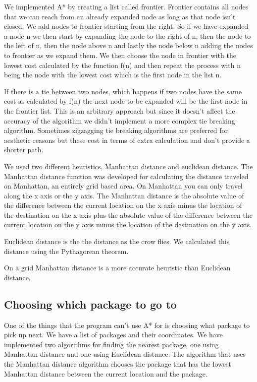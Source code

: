 \documentclass[12pt, a4paper]{article}
\begin{document}
We implemented A* by creating a list called frontier. Frontier contains all nodes that we can reach from an already expanded node as long as that node isn't closed. We add nodes to frontier starting from the right. So if we have expanded a node n we then start by expanding the node to the right of n, then the node to the left of n, then the node above n and lastly the node below n adding the nodes to frontier as we expand them. We then choose the node in frontier with the lowest cost calculated by the function f(n) and then repeat the process with n being the node with the lowest cost which is the first node in the list n.

If there is a tie between two nodes, which happens if two nodes have the same cost as calculated by f(n) the next node to be expanded will be the first node in the frontier list. This is an arbitrary approach but since it doesn't affect the accuracy of the algorithm we didn't implement a more complex tie breaking algorithm. Sometimes zigzagging tie breaking algorithms are preferred for aesthetic reasons but these cost in terms of extra calculation and don't provide a shorter path. 

We used two different heuristics, Manhattan distance and euclidean distance. The Manhattan distance function was developed for calculating the distance traveled on Manhattan, an entirely grid based area. On Manhattan you can only travel along the x axis or the y axis. The Manhattan distance is the absolute value of the difference between the current location on the x axis minus the location of the destination on the x axis plus the absolute value of the difference between the current location on the y axis minus the location of the destination on the y axis.

Euclidean distance is the the distance as the crow flies. We calculated this distance using the Pythagorean theorem. 

On a grid Manhattan distance is a more accurate heuristic than Euclidean distance. 

\subsection{Choosing which package to go to}

One of the things that the program can't use A* for is choosing what package to pick up next. We have a list of packages and their coordinates. We have implemented two algorithms for finding the nearest package, one using Manhattan distance and one using Euclidean distance. The algorithm that uses the Manhattan distance algorithm chooses the package that has the lowest Manhattan distance between the current location and the package.
\end{document}
